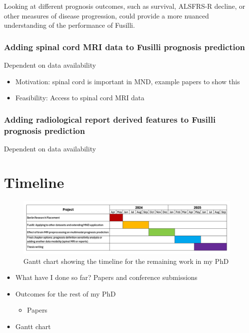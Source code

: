 Looking at different prognosis outcomes, such as survival, ALSFRS-R decline, or other measures of disease progression, could provide a more nuanced understanding of the performance of Fusilli.

\subsubsection*{Adding spinal cord MRI data to Fusilli prognosis prediction}
Dependent on data availability
\begin{itemize}
    \item Motivation: spinal cord is important in MND, example papers to show this
    \item Feasibility: Access to spinal cord MRI data
\end{itemize}

\subsubsection{Adding radiological report derived features to Fusilli prognosis prediction}
Dependent on data availability
\section{Timeline}

\begin{figure}
    \centering
    \hspace*{-0.1\textwidth}
    \includegraphics[width=1.2\textwidth]{figures/gantt_chart}
    \caption{Gantt chart showing the timeline for the remaining work in my PhD}
    \label{fig:gantt_chart}
\end{figure}

\begin{itemize}
    \item What have I done so far? Papers and conference submissions
    \item Outcomes for the rest of my PhD
    \begin{itemize}
        \item Papers
    \end{itemize}
    \item Gantt chart
\end{itemize}
